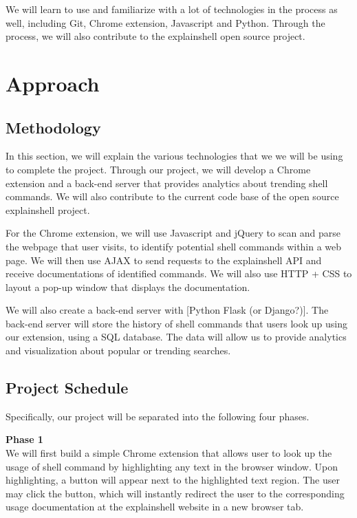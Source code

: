 \documentclass[11pt]{article}
\begin{document}
We will learn to use and familiarize with a lot of technologies in the process as well, including Git, Chrome extension, Javascript and Python. Through the process, we will also contribute to the explainshell open source project.

\section{Approach}
\subsection{Methodology}

In this section, we will explain the various technologies that we we will be using to complete the project. Through our project, we will develop a Chrome extension and a back-end server that provides analytics about trending shell commands. We will also contribute to the current code base of the open source explainshell project. 

For the Chrome extension, we will use Javascript and jQuery to scan and parse the webpage that user visits, to identify potential shell commands within a web page. We will then use AJAX to send requests to the explainshell API and receive documentations of identified commands. We will also use HTTP + CSS to layout a pop-up window that displays the documentation. 

We will also create a back-end server with [Python Flask (or Django?)]. The back-end server will store the history of shell commands that users look up using our extension, using a SQL database. The data will allow us to provide analytics and visualization about popular or trending searches.

\subsection{Project Schedule}
Specifically, our project will be separated into the following four phases. 

\par{\bf Phase 1}\\ 
We will first build a simple Chrome extension that allows user to look up the usage of shell command by highlighting any text in the browser window. Upon highlighting, a button will appear next to the highlighted text region. The user may click the button, which will instantly redirect the user to the corresponding usage documentation at the explainshell website in a new browser tab.
\end{document}
